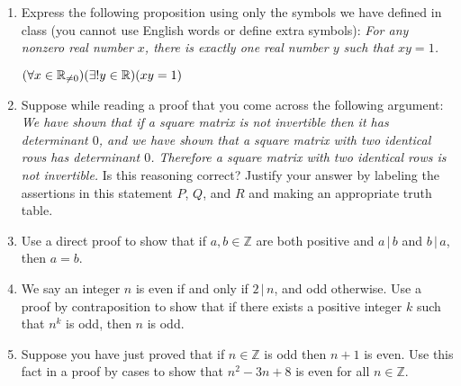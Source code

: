 \documentclass{article}
\newcommand{\bR}{\mathbb{R}}
\newcommand{\bZ}{\mathbb{Z}}
\begin{document}
{\begin{enumerate}[labelindent=0pt,leftmargin=0pt]
\begin{enumerate}
\end{enumerate}


\item Express the following proposition using only the symbols we have
defined in class (you cannot use English words or define extra symbols):
\textit{For any nonzero real number $x$, there is exactly one real number
$y$ such that $xy=1$.}

\subitem $(\forall x \in \Bbb R_{\ne 0})(\exists!y \in\bR)(xy=1)$


\item Suppose while reading a proof that you come across the following
argument: \textit{We have shown that if a square matrix is not invertible
then it has determinant $0$, and we have shown that a square matrix with
two identical rows has determinant $0$. Therefore a square matrix with two
identical rows is not invertible.} Is this reasoning correct? Justify your
answer by labeling the assertions in this statement $P$, $Q$, and $R$ and
making an appropriate truth table.

\item Use a direct proof to show that if $a,b\in\bZ$ are both positive
and $a\,|\,b$ and $b\,|\,a$, then $a=b$.

\item We say an integer $n$ is even if and only if $2\,|\,n$, and odd
otherwise. Use a proof by contraposition to show that if there exists a
positive integer $k$ such that $n^k$ is odd, then $n$ is odd.

\item Suppose you have just proved that if $n\in\bZ$ is odd then $n+1$
is even. Use this fact in a proof by cases to show that $n^2-3n+8$ is even
for all $n\in\bZ$.
\end{enumerate}
}
\end{document}

